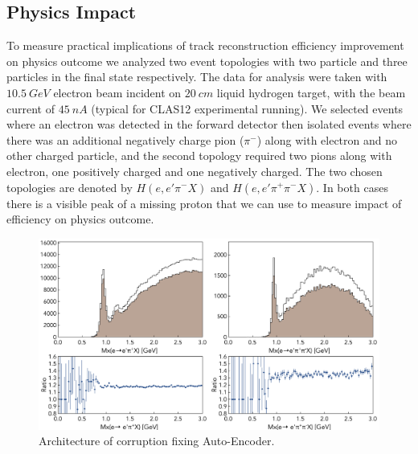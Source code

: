 \subsection{Physics Impact}

To measure practical implications of track reconstruction efficiency improvement on physics outcome we analyzed 
two event topologies with two particle and three particles in the final state respectively. The data for analysis were 
taken with $10.5~GeV$ electron beam incident on $20~cm$ liquid hydrogen target, with the beam current of $45~nA$
(typical for CLAS12 experimental running). We selected events where an electron was detected in the forward detector 
then isolated events where there was an additional negatively charge pion ($\pi^-$) along with electron and no other 
charged particle, and the second topology required two pions along with electron, one positively charged and one 
negatively charged. The two chosen topologies are denoted by $H(e,e'\pi^-X)$ and $H(e,e'\pi^+\pi^-X)$. In both cases 
there is a visible peak of a missing proton that we can use to measure impact of efficiency on physics outcome. 

 \begin{figure}[!ht]
\begin{center}
 \includegraphics[width=6.0in]{images/physics_scan.pdf}
\caption {Architecture of corruption fixing Auto-Encoder.}
 \label{physics:outcome}
 \end{center}
\end{figure}

